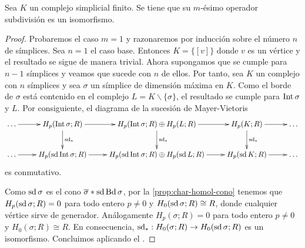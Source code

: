 \begin{proposicion}
	Sea $K$ un complejo simplicial finito. Se tiene que su $m$-ésimo operador subdivisión es un isomorfismo.
\end{proposicion}
\begin{proof}
	Probaremos el caso $m=1$ y razonaremos por inducción sobre el número $n$ de símplices. Sea $n=1$ el caso base. Entonces $K = \{[v]\}$ donde $v$ es un vértice y el resultado se sigue de manera trivial. Ahora supongamos que se cumple para $n-1$ símplices y veamos que sucede con $n$ de ellos. Por tanto, sea $K$ un complejo con $n$ símplices y sea $\sigma$ un símplice de dimensión máxima en $K$. Como el borde de $\sigma$ está contenido en el complejo $L = K \backslash \{\sigma\}$, el resultado se cumple para $\operatorname{Int} \sigma$ y $L$. Por consiguiente, el diagrama de la sucesión de Mayer-Vietoris
	\[
	\xymatrix{
		\dots \ar@{->}[r] & H_p(\interior \sigma;R) \ar@{->}[r] \ar@{->}[d]^{\sd_*} & H_p(\interior \sigma;R) \oplus H_p(L;R) \ar@{->}[d]^{\sd_*} \ar@{->}[r] & H_p(K;R) \ar@{->}[r] \ar@{->}[d]^{\sd_*} & \dots \\
		\dots \ar@{->}[r] & H_p(\sd \interior \sigma;R) \ar@{->}[r] & H_p(\sd \interior \sigma;R) \oplus H_p(\sd L;R) \ar@{->}[r] & H_p(\sd K;R) \ar@{->}[r] & \dots
	}
	\]
	es conmutativo.
	
	Como $\operatorname{sd} \sigma$ es el cono $\overline{\sigma} \ast \operatorname{sd} \operatorname{Bd} \sigma$, por la \autoref{prop:char-homol-cono} tenemos que $H_p(\operatorname{sd} \sigma;R) = 0$ para todo entero $p \neq 0$ y $H_0(\operatorname{sd} \sigma;R) \cong R$, donde cualquier vértice sirve de generador. Análogamente $H_p(\sigma;R) = 0$ para todo entero $p \neq 0$ y $H_0(\sigma;R) \cong R$. En consecuencia, $\operatorname{sd}_* : H_0(\sigma;R) \to H_0(\operatorname{sd} \sigma;R)$ es un isomorfismo. Concluimos aplicando el . 
\end{proof}

